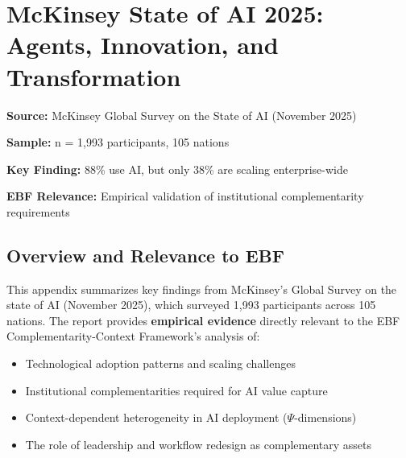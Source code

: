 
\section{McKinsey State of AI 2025: Agents, Innovation, and Transformation}
\label{appendix:VVV1_mckinsey_ai_2025}

\begin{tcolorbox}[colback=blue!5!white, colframe=blue!75!black,
    title=Quick Reference: VVV1 McKinsey Report]

\textbf{Source:} McKinsey Global Survey on the State of AI (November 2025)

\textbf{Sample:} n = 1,993 participants, 105 nations

\textbf{Key Finding:} 88\% use AI, but only 38\% are scaling enterprise-wide

\textbf{EBF Relevance:} Empirical validation of institutional complementarity requirements

\end{tcolorbox}


\subsection{Overview and Relevance to EBF}

This appendix summarizes key findings from McKinsey's Global Survey on the state of AI (November 2025), which surveyed 1,993 participants across 105 nations. The report provides \textbf{empirical evidence} directly relevant to the EBF Complementarity-Context Framework's analysis of:

\begin{itemize}
\item Technological adoption patterns and scaling challenges
\item Institutional complementarities required for AI value capture
\item Context-dependent heterogeneity in AI deployment ($\Psi$-dimensions)
\item The role of leadership and workflow redesign as complementary assets
\end{itemize}


